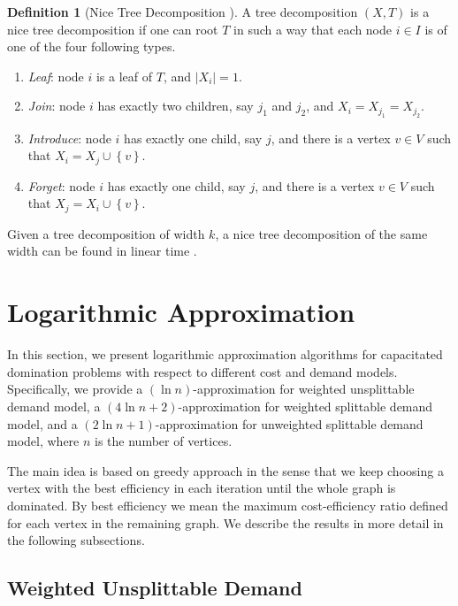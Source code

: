 \documentclass[a4paper,11pt]{article}
\theoremstyle{definition}
\newtheorem{definition}{Definition}
\begin{document}
\begin{definition}[Nice Tree Decomposition \cite{DBLP:books/sp/Kloks94}]
A tree decomposition $(X,T)$ is a nice tree decomposition if one can root $T$ in such a way that each node $i \in I$ is of one of the four following types.
\begin{enumerate}
    \item{{\em Leaf}: node $i$ is a leaf of $T$, and $\left|X_i\right| = 1$.}
    \item{{\em Join}: node $i$ has exactly two children, say $j_1$ and $j_2$, and $X_i = X_{j_1} = X_{j_2}$.}
    \item{{\em Introduce}: node $i$ has exactly one child, say $j$, and there is a vertex $v \in V$ such that $X_i = X_j \cup \left\{v\right\}$.}
    \item{{\em Forget}: node $i$ has exactly one child, say $j$, and there is a vertex $v \in V$ such that $X_j = X_i \cup \left\{v\right\}$.}
\end{enumerate}
\end{definition}

Given a tree decomposition of width $k$, a nice tree decomposition of the same width can be found in linear time \cite{DBLP:books/sp/Kloks94}.



\section{Logarithmic Approximation} \label{logarithmic_approximations}

In this section, we present logarithmic approximation algorithms for
capacitated domination problems with respect to different cost and
demand models. Specifically, we provide a $(\ln n)$-approximation
for weighted unsplittable demand model, a $(4\ln n+2)$-approximation for weighted splittable demand model, and a
$(2\ln n+1)$-approximation for unweighted splittable demand model,
where $n$ is the number of vertices.

The main idea is based on greedy approach in the sense that we keep choosing
a vertex with the best efficiency in each iteration until the whole
graph is dominated.
By best efficiency we mean the maximum cost-efficiency ratio defined for 
each vertex in the remaining graph.
We describe the results in more detail in the following
subsections.

\subsection{Weighted Unsplittable Demand}
\label{section_weighted_unsplittable}
\end{document}
